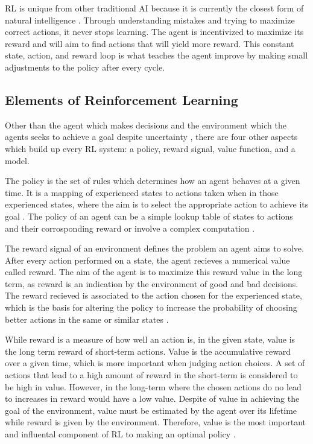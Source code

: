 RL is unique from other traditional AI because it is currently the closest form of natural intelligence \cite{Sutton1}. Through understanding mistakes and trying to maximize correct actions, it never stops learning. The agent is incentivized to maximize its reward and will aim to find actions that will yield more reward. This constant state, action, and reward loop is what teaches the agent improve by making small adjustments to the policy after every cycle. 

\subsection{Elements of Reinforcement Learning}

Other than the agent which makes decisions and the environment which the agents seeks to achieve a goal despite uncertainty \cite{Sutton1}, there are four other aspects which build up every RL system: a policy, reward signal, value function, and a model.

The policy is the set of rules which determines how an agent behaves at a given time. It is a mapping of experienced states to actions taken when in those experienced states, where the aim is to select the appropriate action to achieve its goal \cite{GabrieleDe}. The policy of an agent can be a simple lookup table of states to actions and their corrosponding reward or involve a complex computation \cite{Sutton1}. 

The reward signal of an environment defines the problem an agent aims to solve. After every action performed on a state, the agent recieves a numerical value called reward. The aim of the agent is to maximize this reward value in the long term, as reward is an indication by the environment of good and bad decisions. The reward recieved is associated to the action chosen for the experienced state, which is the basis for altering the policy to increase the probability of choosing better actions in the same or similar states \cite{Sutton1}. 

While reward is a measure of how well an action is, in the given state, value is the long term reward of short-term actions. Value is the accumulative reward over a given time, which is more important when judging action choices. A set of actions that lead to a high amount of reward in the short-term is considered to be high in value. However, in the long-term where the chosen actions do no lead to increases in reward would have a low value. Despite of value in achieving the goal of the environment, value must be estimated by the agent over its lifetime while reward is given by the environment. Therefore, value is the most important and influental component of RL to making an optimal policy \cite{Sutton1}. 



